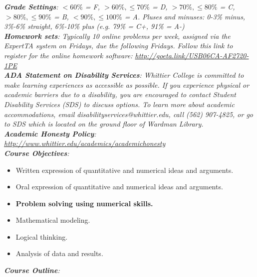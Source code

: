 \documentclass[10pt]{article}
\begin{document}
\textit{\textbf{Grade Settings}: $<60\%$ = F, $>60\%,\leq 70\%$ = D, $>70\%,\leq80\%$ = C, $>80\%,\leq 90\%$ = B, $<90\%,\leq 100\%$ = A.  Pluses and minuses: 0-3\% minus, 3\%-6\% straight, 6\%-10\% plus (e.g. 79\% = C+, 91\% = A-)} \\
\textit{\textbf{Homework sets}: Typically 10 online problems per week, assigned via the ExpertTA system on Fridays, due the following Fridays.  Follow this link to register for the online homework software: \url{http://goeta.link/USB06CA-AF2720-1PE}} \\
\textit{\textbf{ADA Statement on Disability Services}: Whittier College is committed to make learning experiences as accessible as possible. If you experience physical or academic barriers due to a disability, you are encouraged to contact Student Disability Services (SDS) to discuss options. To learn more about academic accommodations, email disabilityservices@whittier.edu, call (562) 907-4825, or go to SDS which is located on the ground floor of Wardman Library.} \\
\textit{\textbf{Academic Honesty Policy}: \url{http://www.whittier.edu/academics/academichonesty}} \\
\textit{\textbf{Course Objectives}:}
\begin{itemize}
\item Written expression of quantitative and numerical ideas and arguments.
\item Oral expression of quantitative and numerical ideas and arguments.
\item \textbf{Problem solving using numerical skills.}
\item Mathematical modeling.
\item Logical thinking.
\item Analysis of data and results.
\end{itemize}
\textit{\textbf{Course Outline}:}
\end{document}
